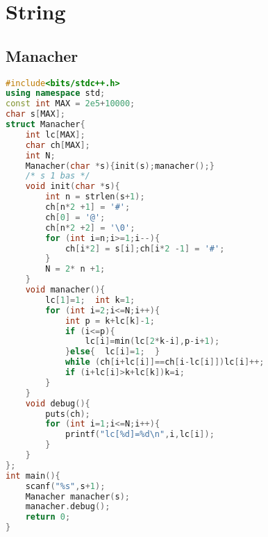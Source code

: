 \section{String}
\subsection{Manacher}
\begin{lstlisting}[language=C++]
#include<bits/stdc++.h>
using namespace std;
const int MAX = 2e5+10000;
char s[MAX];
struct Manacher{
    int lc[MAX];
    char ch[MAX];
    int N;
    Manacher(char *s){init(s);manacher();}
    /* s 1 bas */
    void init(char *s){
        int n = strlen(s+1);
        ch[n*2 +1] = '#';
        ch[0] = '@';
        ch[n*2 +2] = '\0';
        for (int i=n;i>=1;i--){
            ch[i*2] = s[i];ch[i*2 -1] = '#';
        }
        N = 2* n +1;
    }
    void manacher(){
        lc[1]=1;  int k=1;
        for (int i=2;i<=N;i++){
            int p = k+lc[k]-1;
            if (i<=p){
                lc[i]=min(lc[2*k-i],p-i+1);
            }else{  lc[i]=1;  }
            while (ch[i+lc[i]]==ch[i-lc[i]])lc[i]++;
            if (i+lc[i]>k+lc[k])k=i;
        }
    }
    void debug(){
        puts(ch);
        for (int i=1;i<=N;i++){
            printf("lc[%d]=%d\n",i,lc[i]);
        }
    }
};
int main(){
    scanf("%s",s+1);
    Manacher manacher(s);
    manacher.debug();
    return 0;
}
\end{lstlisting}
